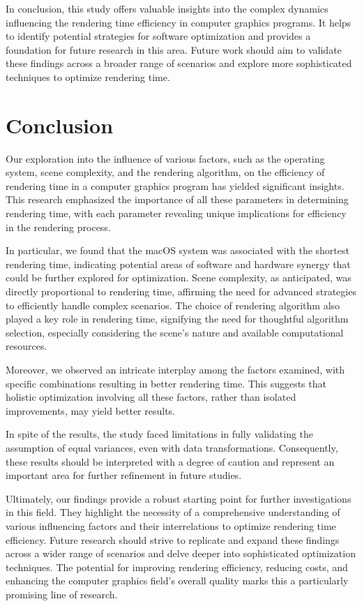 \documentclass[conference]{IEEEtran}
\begin{document}
In conclusion, this study offers valuable insights into the complex dynamics influencing the rendering time efficiency in computer graphics programs. It helps to identify potential strategies for software optimization and provides a foundation for future research in this area. Future work should aim to validate these findings across a broader range of scenarios and explore more sophisticated techniques to optimize rendering time. 

\section{Conclusion}
Our exploration into the influence of various factors, such as the operating system, scene complexity, and the rendering algorithm, on the efficiency of rendering time in a computer graphics program has yielded significant insights. This research emphasized the importance of all these parameters in determining rendering time, with each parameter revealing unique implications for efficiency in the rendering process.

In particular, we found that the macOS system was associated with the shortest rendering time, indicating potential areas of software and hardware synergy that could be further explored for optimization. Scene complexity, as anticipated, was directly proportional to rendering time, affirming the need for advanced strategies to efficiently handle complex scenarios. The choice of rendering algorithm also played a key role in rendering time, signifying the need for thoughtful algorithm selection, especially considering the scene's nature and available computational resources.

Moreover, we observed an intricate interplay among the factors examined, with specific combinations resulting in better rendering time. This suggests that holistic optimization involving all these factors, rather than isolated improvements, may yield better results.

In spite of the results, the study faced limitations in fully validating the assumption of equal variances, even with data transformations. Consequently, these results should be interpreted with a degree of caution and represent an important area for further refinement in future studies.

Ultimately, our findings provide a robust starting point for further investigations in this field. They highlight the necessity of a comprehensive understanding of various influencing factors and their interrelations to optimize rendering time efficiency. Future research should strive to replicate and expand these findings across a wider range of scenarios and delve deeper into sophisticated optimization techniques. The potential for improving rendering efficiency, reducing costs, and enhancing the computer graphics field's overall quality marks this a particularly promising line of research.
\end{document}
